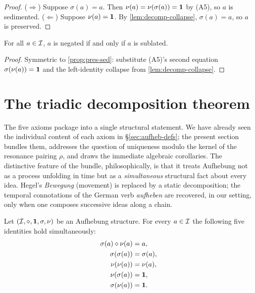 \begin{proof}
($\Rightarrow$) Suppose $\sigma(a)=a$. Then
$\nu(a)=\nu(\sigma(a))=\mathbf{1}$ by (A5), so $a$ is sedimented.
($\Leftarrow$) Suppose $\nu(a)=\mathbf{1}$. By
\cref{lem:decomp-collapse}, $\sigma(a)=a$, so $a$ is preserved.
\end{proof}

\begin{proposition}\label{prop:neg-sub}
For all $a\in\mathcal{I}$, $a$ is negated if and only if $a$ is sublated.
\end{proposition}

\begin{proof}
Symmetric to \cref{prop:pres-sed}: substitute (A5)'s second equation
$\sigma(\nu(a))=\mathbf{1}$ and the left-identity collapse from
\cref{lem:decomp-collapse}.
\end{proof}

\section{The triadic decomposition theorem}\label{sec:triadic-decomp}

The five axioms package into a single structural statement. We have
already seen the individual content of each axiom in
\S\ref{sec:aufheb-defs}; the present section bundles them, addresses
the question of uniqueness modulo the kernel of the resonance
pairing $\rho$, and draws the immediate algebraic corollaries. The
distinctive feature of the bundle, philosophically, is that it
treats Aufhebung not as a process unfolding in time but as a
\emph{simultaneous} structural fact about every idea. Hegel's
\emph{Bewegung} (movement) is replaced by a static decomposition;
the temporal connotations of the German verb \emph{aufheben} are
recovered, in our setting, only when one composes successive ideas
along a chain.

\begin{theorem}\label{thm:3-1}
Let $(\mathcal{I},\mathbin{\diamond},\mathbf{1},\sigma,\nu)$ be an Aufhebung structure.
For every $a\in\mathcal{I}$ the following five identities hold
simultaneously:
\begin{align*}
\sigma(a)\mathbin{\diamond}\nu(a) &= a, \\
\sigma(\sigma(a)) &= \sigma(a), \\
\nu(\nu(a)) &= \nu(a), \\
\nu(\sigma(a)) &= \mathbf{1}, \\
\sigma(\nu(a)) &= \mathbf{1}.
\end{align*}
\end{theorem}

